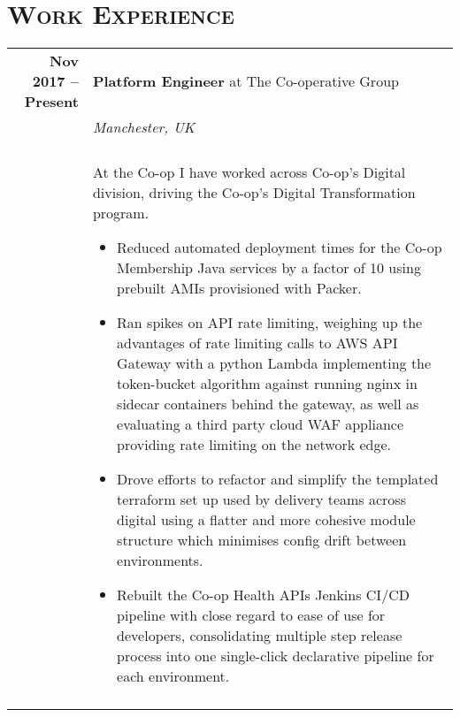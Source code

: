 \documentclass[a4paper,10pt]{article} %
\begin{document}
\section{\textsc{Work Experience}}
\centering
\begin{tabularx}{\textwidth}{r|X}

\textbf{Nov 2017 -- Present}        & \textbf{Platform Engineer} at The Co-operative Group \\
                                    & \emph{Manchester, UK} \\
                                    & \\
                                    & \footnotesize
    {At the Co-op I have worked across Co-op's Digital division, driving the
        Co-op's Digital Transformation program.
    \begin{itemize}
    \item Reduced automated deployment times for the Co-op Membership Java
        services by a factor of 10 using prebuilt AMIs provisioned with Packer.
    \item Ran spikes on API rate limiting, weighing up the advantages of rate
        limiting calls to AWS API Gateway with a python Lambda implementing the
        token-bucket algorithm against running nginx in sidecar containers
        behind the gateway, as well as evaluating a third party cloud WAF
        appliance providing rate limiting on the network edge.
    \item Drove efforts to refactor and simplify the templated terraform set up
        used by delivery teams across digital using a flatter and more cohesive
        module structure which minimises config drift between environments.
    \item Rebuilt the Co-op Health APIs Jenkins CI/CD pipeline with close
        regard to ease of use for developers, consolidating multiple step
        release process into one single-click declarative pipeline for each
        environment.
    \end{itemize}}\\

\multicolumn{2}{r}{} \\ %


\end{tabularx}
\end{document}
